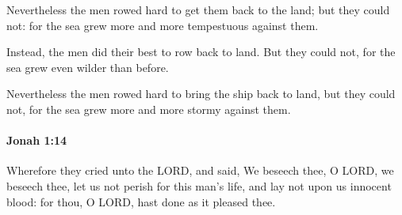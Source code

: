 			\begin{versebox}
					\item[BHS] 
					\item[LXX] 
					\item[ASV] Nevertheless the men rowed hard to get them back to the land; but they could not: for the sea grew more and more tempestuous against them.
					\item[NIV] Instead, the men did their best to row back to land. But they could not, for the sea grew even wilder than before.
					\item[NRSV] Nevertheless the men rowed hard to bring the ship back to land, but they could not, for the sea grew more and more stormy against them.
			\end{versebox}

		\paragraph{Jonah 1:14} %
			\label{JONAH-1-14}

			Wherefore they cried unto the LORD, and said, We beseech thee, O LORD, we beseech thee, let us not perish for this man’s life, and lay not upon us innocent blood: for thou, O LORD, hast done as it pleased thee.

